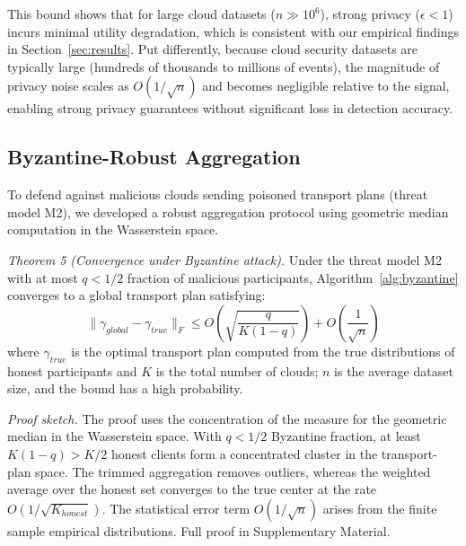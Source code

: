 \documentclass{ieeeaccess}
\theoremstyle{plain}
\theoremstyle{definition}
\theoremstyle{remark}
\begin{document}
This bound shows that for large cloud datasets ($n \gg 10^6$), strong privacy ($\epsilon < 1$) incurs minimal utility degradation, which is consistent with our empirical findings in Section~\ref{sec:results}. Put differently, because cloud security datasets are typically large (hundreds of thousands to millions of events), the magnitude of privacy noise scales as $O(1/\sqrt{n})$ and becomes negligible relative to the signal, enabling strong privacy guarantees without significant loss in detection accuracy.

\subsection{Byzantine-Robust Aggregation}

To defend against malicious clouds sending poisoned transport plans (threat model M2), we developed a robust aggregation protocol using geometric median computation in the Wasserstein space.

\textit{Theorem 5 (Convergence under Byzantine attack).} Under the threat model M2 with at most $q < 1/2$ fraction of malicious participants, Algorithm~\ref{alg:byzantine} converges to a global transport plan satisfying:
\begin{equation}
\|\gamma_{global} - \gamma_{true}\|_F \leq O\left(\sqrt{\frac{q}{K(1-q)}}\right) + O\left(\frac{1}{\sqrt{n}}\right)
\end{equation}
where $\gamma_{true}$ is the optimal transport plan computed from the true distributions of honest participants and $K$ is the total number of clouds; $n$ is the average dataset size, and the bound has a high probability.

\textit{Proof sketch.} The proof uses the concentration of the measure for the geometric median in the Wasserstein space. With $q < 1/2$ Byzantine fraction, at least $K(1-q) > K/2$ honest clients form a concentrated cluster in the transport-plan space. The trimmed aggregation removes outliers, whereas the weighted average over the honest set converges to the true center at the rate $O(1/\sqrt{K_{honest}})$. The statistical error term $O(1/\sqrt{n})$ arises from the finite sample empirical distributions. Full proof in Supplementary Material.
\end{document}
